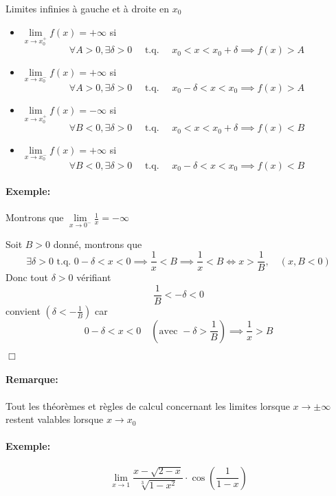 \documentclass[
    11pt,
    a4paper,
    oneside,
    headinlcude, footinclude,
    twoside,
]{report}
\newcommand{\tq}[0]{\textrm{ t.q. }}
\newcommand{\cqfd}[0]{\begin{flushright}$\Box$\end{flushright}}
\begin{document}
Limites infinies à gauche et à droite en $x_{0}$

\begin{itemize}
\item $\lim\limits_{x \to x_{0}^{+}} f(x) = + \infty$ si
$$\forall A > 0, \exists \delta > 0 \quad \tq \quad x_{0} < x < x_{0} + \delta
\implies f(x) > A$$

\item $\lim\limits_{x \to x_{0}^{-}} f(x) = + \infty$ si
$$\forall A > 0, \exists \delta > 0 \quad \tq \quad x_{0} - \delta < x < x_{0}
\implies f(x) > A$$

\item $\lim\limits_{x \to x_{0}^{+}} f(x) = - \infty$ si
$$\forall B < 0, \exists \delta > 0 \quad \tq \quad x_{0} < x < x_{0} + \delta
\implies f(x) < B$$

\item $\lim\limits_{x \to x_{0}^{-}} f(x) = + \infty$ si
$$\forall B < 0, \exists \delta > 0 \quad \tq \quad x_{0} - \delta < x < x_{0}
\implies f(x) < B$$
\end{itemize}

\paragraph{Exemple:}

Montrons que $\lim\limits_{x \to 0^{-}} \frac{1}{x} = - \infty$

Soit $B > 0$ donné, montrons que $$\exists \delta > 0 \tq 0 - \delta < x < 0
\implies \frac{1}{x} < B \implies \frac{1}{x} < B \iff x > \frac{1}{B}, \quad (x, B
< 0)$$
Donc tout $\delta > 0$ vérifiant $$\frac{1}{B} < - \delta < 0$$ convient $(\delta
< - \frac{1}{B})$ car $$0 - \delta < x < 0 \quad (\text{avec } - \delta > \frac{1}{B})
\implies \frac{1}{x} > B$$

\cqfd

\paragraph{Remarque:}

Tout les théorèmes et règles de calcul concernant les limites lorsque $x \to
\pm \infty$ restent valables lorsque $x \to x_{0}$

\paragraph{Exemple:}

$$ \lim_{x \to 1} \frac{x - \sqrt{ 2 - x }}{\sqrt[3]{1 - x^{2}}} \cdot \cos \left(\frac{1}{1-x}\right) $$
\end{document}
